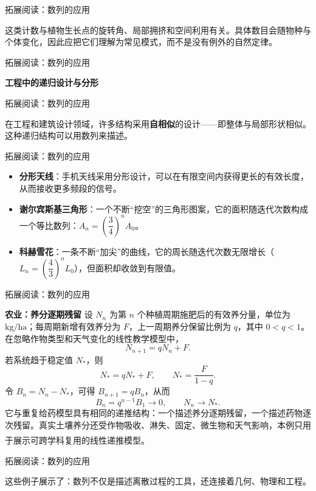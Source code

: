 \documentclass[aspectratio=169,10pt,fontset=fandol]{ctexbeamer}
\newcommand{\upcite}[1]{\textsuperscript{\textsuperscript{\cite{#1}}}}
\begin{document}
\begin{frame}[t,fragile]{拓展阅读：数列的应用}
\footnotesize
{\footnotesize
这类计数与植物生长点的旋转角、局部拥挤和空间利用有关。具体数目会随物种与个体变化，因此应把它们理解为常见模式，而不是没有例外的自然定律。


}
\end{frame}
\begin{frame}[t,fragile]{拓展阅读：数列的应用}
\footnotesize
{\footnotesize

\textbf{工程中的递归设计与分形}


}
\end{frame}
\begin{frame}[t,fragile]{拓展阅读：数列的应用}
\footnotesize
{\footnotesize
在工程和建筑设计领域，许多结构采用\textbf{自相似}的设计——即整体与局部形状相似。这种递归结构可以用数列来描述。


}
\end{frame}
\begin{frame}[t,fragile]{拓展阅读：数列的应用}
\footnotesize
{\footnotesize
\begin{itemize}
\item \textbf{分形天线}：手机天线采用分形设计，可以在有限空间内获得更长的有效长度，从而接收更多频段的信号。
\item \textbf{谢尔宾斯基三角形}：一个不断“挖空”的三角形图案，它的面积随迭代次数构成一个等比数列：\(A_n = \left(\dfrac{3}{4}\right)^n A_0\)。
\item \textbf{科赫雪花}：一条不断“加尖”的曲线，它的周长随迭代次数无限增长（\(L_n = \left(\dfrac{4}{3}\right)^n L_0\)），但面积却收敛到有限值。
\end{itemize}
}
\end{frame}
\begin{frame}[t,fragile]{拓展阅读：数列的应用}
\footnotesize
{\footnotesize

\textbf{农业：养分逐期残留}
设 $N_n$ 为第 $n$ 个种植周期施肥后的有效养分量，单位为 $\mathrm{kg/ha}$；每周期新增有效养分为 $F$，上一周期养分保留比例为 $q$，其中 $0<q<1$。在忽略作物类型和天气变化的线性教学模型中，
\[
N_{n+1}=qN_n+F.
\]
若系统趋于稳定值 $N_*$，则
\[
N_*=qN_*+F,\qquad N_*=\frac{F}{1-q}.
\]
令 $B_n=N_n-N_*$，可得 $B_{n+1}=qB_n$，从而
\[
B_n=q^{n-1}B_1\to0,\qquad N_n\to N_*.
\]
它与重复给药模型具有相同的递推结构：一个描述养分逐期残留，一个描述药物逐次残留。真实土壤养分还受作物吸收、淋失、固定、微生物和天气影响，本例只用于展示可跨学科复用的线性递推模型。\upcite{BradyWeil}


}
\end{frame}
\begin{frame}[t,fragile]{拓展阅读：数列的应用}
\footnotesize
{\footnotesize
这些例子展示了：数列不仅是描述离散过程的工具，还连接着几何、物理和工程。

}
\end{frame}
\end{document}
